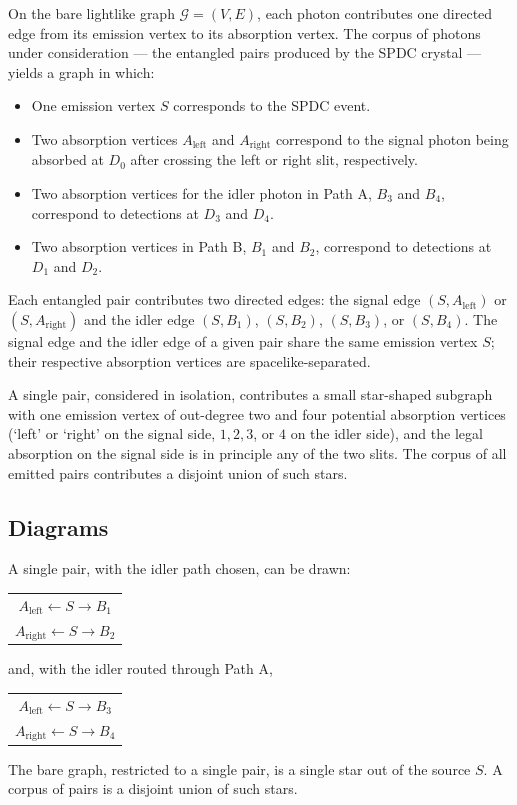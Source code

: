 \documentclass[11pt]{article}
\begin{document}
On the bare lightlike graph $\mathcal{G} = (V, E)$, each photon contributes one directed edge from its emission vertex to its absorption vertex. The corpus of photons under consideration --- the entangled pairs produced by the SPDC crystal --- yields a graph in which:

\begin{itemize}
    \item One emission vertex $S$ corresponds to the SPDC event.
    \item Two absorption vertices $A_{\text{left}}$ and $A_{\text{right}}$ correspond to the signal photon being absorbed at $D_0$ after crossing the left or right slit, respectively.
    \item Two absorption vertices for the idler photon in Path A, $B_3$ and $B_4$, correspond to detections at $D_3$ and $D_4$.
    \item Two absorption vertices in Path B, $B_1$ and $B_2$, correspond to detections at $D_1$ and $D_2$.
\end{itemize}

Each entangled pair contributes two directed edges: the signal edge $(S, A_{\text{left}})$ or $(S, A_{\text{right}})$ and the idler edge $(S, B_1)$, $(S, B_2)$, $(S, B_3)$, or $(S, B_4)$. The signal edge and the idler edge of a given pair share the same emission vertex $S$; their respective absorption vertices are spacelike-separated.

A single pair, considered in isolation, contributes a small star-shaped subgraph with one emission vertex of out-degree two and four potential absorption vertices (`left' or `right' on the signal side, $1, 2, 3$, or $4$ on the idler side), and the legal absorption on the signal side is in principle any of the two slits. The corpus of all emitted pairs contributes a disjoint union of such stars.

\subsection{Diagrams}

A single pair, with the idler path chosen, can be drawn:
\begin{center}
\begin{tabular}{c}
$A_{\text{left}} \leftarrow S \rightarrow B_1$ \\[4pt]
$A_{\text{right}} \leftarrow S \rightarrow B_2$
\end{tabular}
\end{center}
and, with the idler routed through Path A,
\begin{center}
\begin{tabular}{c}
$A_{\text{left}} \leftarrow S \rightarrow B_3$ \\[4pt]
$A_{\text{right}} \leftarrow S \rightarrow B_4$
\end{tabular}
\end{center}
The bare graph, restricted to a single pair, is a single star out of the source $S$. A corpus of pairs is a disjoint union of such stars.
\end{document}
